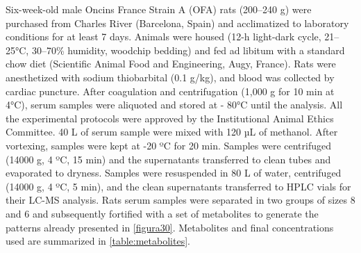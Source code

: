 Six-week-old male Oncins France Strain A (OFA) rats (200–240 g) were purchased from Charles River (Barcelona, Spain) and acclimatized to laboratory conditions for at least 7 days. Animals were housed (12-h light-dark cycle, 21–25°C, 30–70\% humidity, woodchip bedding) and fed ad libitum with a standard chow diet (Scientific Animal Food and Engineering, Augy, France). Rats were anesthetized with sodium thiobarbital (0.1 g/kg), and blood was collected by cardiac puncture. After coagulation and centrifugation (1,000 g for 10 min at 4°C), serum samples were aliquoted and stored at - 80°C until the analysis. All the experimental protocols were approved by the Institutional Animal Ethics Committee. 40 {\textmu}L of serum sample were mixed with 120 µL of methanol. After vortexing, samples were kept at -20 ºC for 20 min. Samples were centrifuged (14000 g, 4 ºC, 15 min) and the supernatants transferred to clean tubes and evaporated to dryness. Samples were resuspended in 80 {\textmu}L of water, centrifuged (14000 g, 4 ºC, 5 min), and the clean supernatants transferred to HPLC vials for their LC-MS analysis. Rats serum samples were separated in two groups of sizes 8 and 6 and subsequently fortified with a set of metabolites to generate the patterns already presented in \autoref{figura30}. Metabolites and final concentrations used are summarized in \autoref{table:metabolites}.

